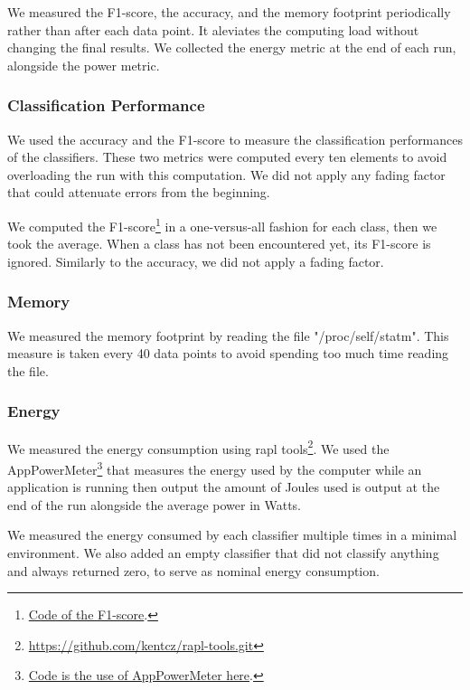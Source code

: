 We measured the F1-score, the accuracy, and the memory footprint periodically
rather than after each data point. It aleviates the computing load without
changing the final results.
We collected the energy metric at the end of each run, alongside the power metric.

\subsubsection{Classification Performance}
We used the accuracy and the F1-score to measure the classification
performances of the classifiers. These two metrics were computed every ten
elements to avoid overloading the run with this computation. We did not apply
any fading factor that could attenuate errors from the beginning.

We computed the
F1-score\footnote{\href{https://github.com/azazel7/paper-benchmark/blob/9adb1039c5a65a00a66d554f0e870d14d3fff7cb/main.cpp\#L82}{Code
of the F1-score}.} in a one-versus-all fashion for each class, then we took the
average.  When a class has not been encountered yet, its F1-score is ignored.
Similarly to the accuracy, we did not apply a fading factor.

\subsubsection{Memory}
We measured the memory footprint by reading the file "/proc/self/statm". This measure is
taken every 40 data points to avoid spending too much time reading the file.

\subsubsection{Energy}
We measured the energy consumption using rapl
tools\footnote{\url{https://github.com/kentcz/rapl-tools.git}}.  We used the
AppPowerMeter\footnote{\href{https://github.com/azazel7/paper-benchmark/blob/9adb1039c5a65a00a66d554f0e870d14d3fff7cb/makefile.py\#L122}{Code
is the use of AppPowerMeter here}.} that measures the energy used by the
computer while an application is running then output the amount of Joules used
is output at the end of the run alongside the average power in Watts.

We measured the energy consumed by each classifier
multiple times in a minimal environment. We also added an empty
classifier that did not classify anything and always
returned zero, to serve as nominal energy consumption.

